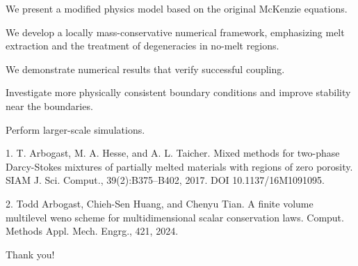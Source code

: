 \documentclass[usenames,dvipsnames,letterpaper,landscape,final]{slides}
\begin{document}
\begin{myslide}

		  \begin{nlist}
		  \item We present a modified physics model based on the original McKenzie equations.

		  \item We develop a locally mass-conservative numerical framework, emphasizing melt extraction and the treatment of degeneracies in no-melt regions.

		  \item We demonstrate numerical results that verify successful coupling.

		  \end{nlist}

		  \bigskip
		  \begin{blist}
		  \item Investigate more physically consistent boundary conditions and improve stability near the boundaries.
        \item Perform larger-scale simulations.
		  \end{blist}

\end{myslide}

\begin{myslide}

1. T. Arbogast, M. A. Hesse, and A. L. Taicher. Mixed methods for two-phase
Darcy-Stokes mixtures of partially melted materials with regions of zero porosity.
SIAM J. Sci. Comput., 39(2):B375–B402, 2017. DOI 10.1137/16M1091095.

\bigskip

2. Todd Arbogast, Chieh-Sen Huang, and Chenyu Tian. A finite volume multilevel
weno scheme for multidimensional scalar conservation laws. Comput. Methods
Appl. Mech. Engrg., 421, 2024.

\bigskip
\bigskip

\centering 
Thank you!
\end{myslide}
\end{document}

